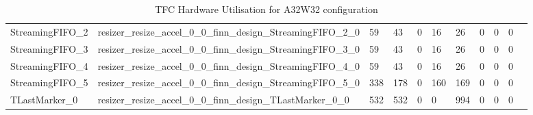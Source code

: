 \begin{landscape}
\begin{table}[!htb]
{\begin{tabular}{l|l|l|l|l|l|l|l|l|l|l}
   StreamingFIFO\_2                                        & resizer\_resize\_accel\_0\_0\_finn\_design\_StreamingFIFO\_2\_0                                        & 59         & 43         & 0       & 16   & 26    & 0      & 0      & 0            \\
   StreamingFIFO\_3                                        & resizer\_resize\_accel\_0\_0\_finn\_design\_StreamingFIFO\_3\_0                                        & 59         & 43         & 0       & 16   & 26    & 0      & 0      & 0            \\
   StreamingFIFO\_4                                        & resizer\_resize\_accel\_0\_0\_finn\_design\_StreamingFIFO\_4\_0                                        & 59         & 43         & 0       & 16   & 26    & 0      & 0      & 0            \\
   StreamingFIFO\_5                                        & resizer\_resize\_accel\_0\_0\_finn\_design\_StreamingFIFO\_5\_0                                        & 338        & 178        & 0       & 160  & 169   & 0      & 0      & 0            \\
   TLastMarker\_0                                          & resizer\_resize\_accel\_0\_0\_finn\_design\_TLastMarker\_0\_0                                          & 532        & 532        & 0       & 0    & 994   & 0      & 0      & 0            \\
\end{tabular}
}
\caption[TFC Hardware Utilisation A32W32]{TFC Hardware Utilisation for A32W32 configuration}
  \label{tab:TFCHardwareA32W32}
\end{table}

\end{landscape}
